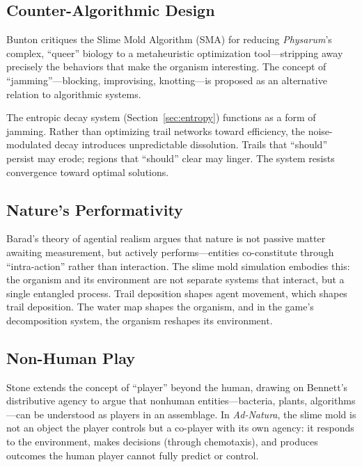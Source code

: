 \documentclass[12pt, titlepage]{article}
\begin{document}
\subsection{Counter-Algorithmic Design}

Bunton \cite{bunton2025} critiques the Slime Mold Algorithm (SMA) for reducing
\textit{Physarum}'s complex, ``queer'' biology to a metaheuristic optimization
tool---stripping away precisely the behaviors that make the organism
interesting. The concept of ``jamming''---blocking, improvising, knotting---is
proposed as an alternative relation to algorithmic systems.

The entropic decay system (Section~\ref{sec:entropy}) functions as a form of
jamming. Rather than optimizing trail networks toward efficiency, the
noise-modulated decay introduces unpredictable dissolution. Trails that
``should'' persist may erode; regions that ``should'' clear may linger. The
system resists convergence toward optimal solutions.

\subsection{Nature's Performativity}

Barad's theory of agential realism \cite{barad2011} argues that nature is not
passive matter awaiting measurement, but actively performs---entities
co-constitute through ``intra-action'' rather than interaction. The slime mold
simulation embodies this: the organism and its environment are not separate
systems that interact, but a single entangled process. Trail deposition shapes
agent movement, which shapes trail deposition. The water map shapes the
organism, and in the game's decomposition system, the organism reshapes its
environment.

\subsection{Non-Human Play}

Stone \cite{stone2019} extends the concept of ``player'' beyond the human,
drawing on Bennett's distributive agency to argue that nonhuman entities---bacteria, plants, algorithms---can be understood as players in an
assemblage. In \textit{Ad-Natura}, the slime mold is not an object the player
controls but a co-player with its own agency: it responds to the environment,
makes decisions (through chemotaxis), and produces outcomes the human player
cannot fully predict or control.
\end{document}
